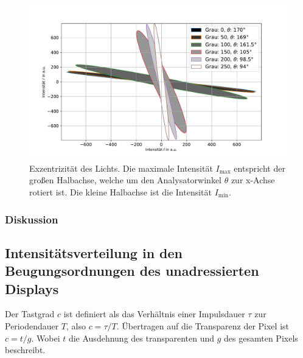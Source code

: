 \documentclass[
	a4paper,
	12pt,
	pagesize,
	ngerman
]{scrartcl}
\begin{document}
\begin{figure}[H]
			\includegraphics[width=1\linewidth]{img/ellipse}
			\caption{
			Exzentrizität des Lichts. Die maximale Intensität $I_\text{max}$ entspricht der großen Halbachse, welche um den Analysatorwinkel $\theta$ zur x-Achse rotiert ist. Die kleine Halbachse ist die Intensität $I_\text{min}$.
			\protect\footnotemark
			}
			\label{fig_ellipse}
	\end{figure}
					\subsubsection*{Diskussion}

		\subsection{Intensitätsverteilung in den Beugungsordnungen des unadressierten Displays}


		Der Tastgrad $c$ ist definiert als das Verhältnis einer Impulsdauer $\tau$ zur Periodendauer $T$, also $c=\tau/T$.
		Übertragen auf die Transparenz der Pixel ist $c=t/g$.
		Wobei $t$ die Ausdehnung des transparenten und $g$ des gesamten Pixels beschreibt.
\end{document}
